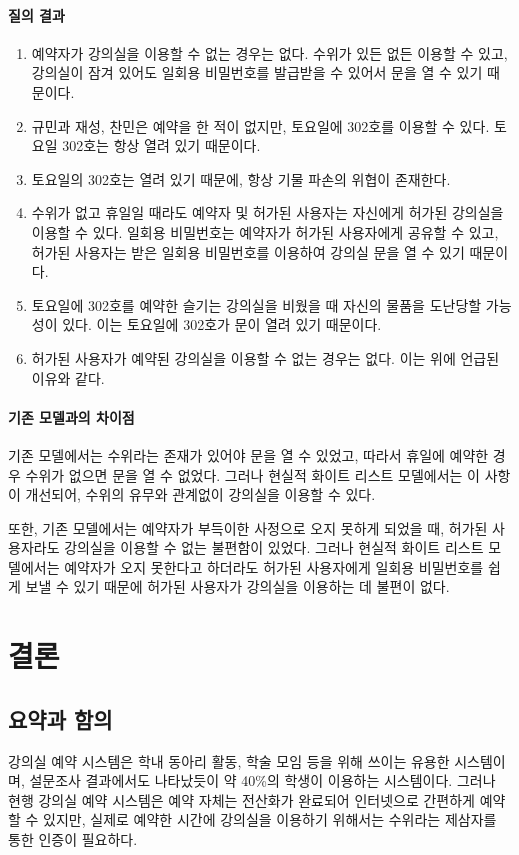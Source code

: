 \documentclass[11pt,a4paper]{article}
\begin{document}
\paragraph{질의 결과}
\begin{enumerate}
\item 예약자가 강의실을 이용할 수 없는 경우는 없다. 수위가 있든 없든 이용할 수
있고, 강의실이 잠겨 있어도 일회용 비밀번호를 발급받을 수 있어서 문을 열 수 있기
때문이다.
\item 규민과 재성, 찬민은 예약을 한 적이 없지만, 토요일에 302호를 이용할 수
있다. 토요일 302호는 항상 열려 있기 때문이다.
\item 토요일의 302호는 열려 있기 때문에, 항상 기물 파손의 위협이 존재한다.
\item 수위가 없고 휴일일 때라도 예약자 및 허가된 사용자는 자신에게 허가된
강의실을 이용할 수 있다. 일회용 비밀번호는 예약자가 허가된 사용자에게 공유할 수
있고, 허가된 사용자는 받은 일회용 비밀번호를 이용하여 강의실 문을 열 수 있기
때문이다.
\item 토요일에 302호를 예약한 슬기는 강의실을 비웠을 때 자신의 물품을 도난당할
가능성이 있다. 이는 토요일에 302호가 문이 열려 있기 때문이다.
\item 허가된 사용자가 예약된 강의실을 이용할 수 없는 경우는 없다. 이는 위에
언급된 이유와 같다.
\end{enumerate}

\paragraph{기존 모델과의 차이점}
\hfill\break
기존 모델에서는 수위라는 존재가 있어야 문을 열 수 있었고, 따라서 휴일에 예약한
경우 수위가 없으면 문을 열 수 없었다. 그러나 현실적 화이트 리스트 모델에서는 이
사항이 개선되어, 수위의 유무와 관계없이 강의실을 이용할 수 있다.

또한, 기존 모델에서는 예약자가 부득이한 사정으로 오지 못하게 되었을 때, 허가된
사용자라도 강의실을 이용할 수 없는 불편함이 있었다. 그러나 현실적 화이트 리스트
모델에서는 예약자가 오지 못한다고 하더라도 허가된 사용자에게 일회용 비밀번호를
쉽게 보낼 수 있기 때문에 허가된 사용자가 강의실을 이용하는 데 불편이 없다.

\section{결론}

\subsection{요약과 함의}
강의실 예약 시스템은 학내 동아리 활동, 학술 모임 등을 위해 쓰이는 유용한
시스템이며, 설문조사 결과에서도 나타났듯이 약 40\%의 학생이 이용하는
시스템이다. 그러나 현행 강의실 예약 시스템은 예약 자체는 전산화가 완료되어
인터넷으로 간편하게 예약할 수 있지만, 실제로 예약한 시간에 강의실을 이용하기
위해서는 수위라는 제삼자를 통한 인증이 필요하다.
\end{document}
